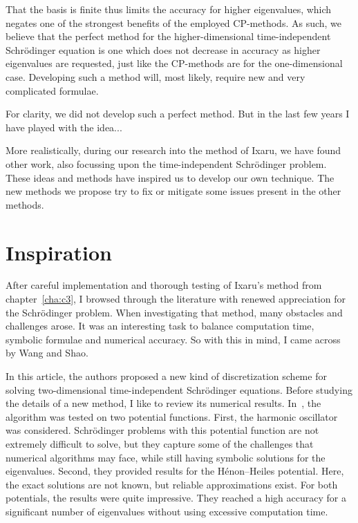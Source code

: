 That the basis is finite thus limits the accuracy for higher eigenvalues, which negates one of the strongest benefits of the employed CP-methods. As such, we believe that the perfect method for the higher-dimensional time-independent Schrödinger equation is one which does not decrease in accuracy as higher eigenvalues are requested, just like the CP-methods are for the one-dimensional case. Developing such a method will, most likely, require new and very complicated formulae.

For clarity, we did not develop such a perfect method. But in the last few years I have played with the idea...

More realistically, during our research into the method of Ixaru, we have found other work, also focussing upon the time-independent Schrödinger problem. These ideas and methods have inspired us to develop our own technique. The new methods we propose try to fix or mitigate some issues present in the other methods.


\section{Inspiration}

After careful implementation and thorough testing of Ixaru's method from chapter~\ref{cha:c3}, I browsed through the literature with renewed appreciation for the Schrödinger problem. When investigating that method, many obstacles and challenges arose. It was an interesting task to balance computation time, symbolic formulae and numerical accuracy. So with this in mind, I came across~\cite{wang_new_2009} by Wang and Shao.

In this article, the authors proposed a new kind of discretization scheme for solving two-dimensional time-independent Schrödinger equations. Before studying the details of a new method, I like to review its numerical results. In~\cite{wang_new_2009}, the algorithm was tested on two potential functions. First, the harmonic oscillator was considered. Schrödinger problems with this potential function are not extremely difficult to solve, but they capture some of the challenges that numerical algorithms may face, while still having symbolic solutions for the eigenvalues. Second, they provided results for the Hénon--Heiles potential. Here, the exact solutions are not known, but reliable approximations exist. For both potentials, the results were quite impressive. They reached a high accuracy for a significant number of eigenvalues without using excessive computation time.

